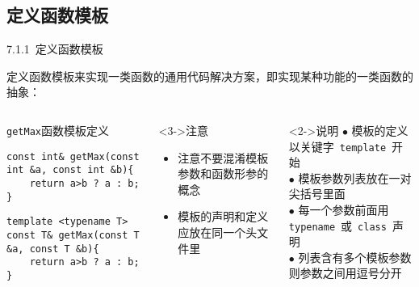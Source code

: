 \subsection{定义函数模板}

\begin{frame}[fragile]{7.1.1~定义函数模板}

定义\alert{函数模板}来实现\alert{一类}函数的\alert{通用}代码解决方案，即实现某种功能的一类函数的抽象：

\vspace{-4mm}

\begin{columns}[t]

\begin{blueblock}{\texttt{getMax}函数模板定义}

\begin{lstlisting}[moreemph={T}]
const int& getMax(const int &a, const int &b){
    return a>b ? a : b;
}
\end{lstlisting}
\begin{lstlisting}[moreemph={T}]
template <typename T>
const T& getMax(const T &a, const T &b){
    return a>b ? a : b;
}
\end{lstlisting}

\end{blueblock}

\begin{redblock}<3->{注意}
\begin{itemize}
  \item 注意不要混淆\alert{模板参数}和\alert{函数形参}的概念
  \item 模板的声明和定义应放在同一个头文件里
\end{itemize}
\end{redblock}

\begin{yellowblock}<2->{说明}
$\bullet$ 模板的定义以关键字~\alert{\texttt{template}}~开始\\
$\bullet$ 模板参数列表放在一对\alert{尖括号}里面\\
$\bullet$ 每一个参数前面用\\\alert{\texttt{typename}}~或~\alert{\texttt{class}}~声明\\
$\bullet$ 列表含有多个模板参数则参数之间用\alert{逗号}分开
\end{yellowblock}

\end{columns}
\end{frame}

